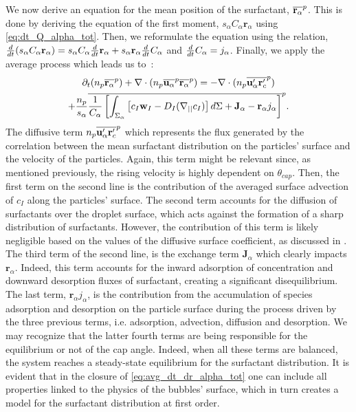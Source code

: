 We now derive an equation for the mean position of the surfactant, $\overline{\textbf{r}_\alpha}^{p}$.
This is done by deriving the equation of the first moment, $s_\alpha C_\alpha \textbf{r}_\alpha$ using \ref{eq:dt_Q_alpha_tot}. 
Then, we reformulate the equation using  the relation, $\frac{d}{d t} (s_\alpha C_\alpha \textbf{r}_\alpha) = s_\alpha C_\alpha\frac{d}{d t} \textbf{r}_\alpha+ s_\alpha \textbf{r}_\alpha\frac{d}{d t} C_\alpha $ and  $\frac{d}{d t} C_\alpha = j_\alpha$. 
Finally,  we apply the average process which leads us to~:
\begin{multline}
    \partial_t (n_p\overline{\textbf{r}_\alpha}^{p})
    + \mathbf{\nabla} \cdot (n_p\overline{\textbf{u}_\alpha}^{p}\overline{\textbf{r}_\alpha}^{p})
    =
    - \mathbf{\nabla} \cdot (n_p\overline{\textbf{u}'_\alpha\textbf{r}'_c}^{p})\\
    + \frac{n_p}{s_\alpha}\overline{
        \frac{1}{C_\alpha}\left[
            \int_{\Sigma_\alpha} 
            \left[
                c_I \textbf{w}_I
                - D_I (\mathbf{\nabla}_{||} c_I)
            \right] d\Sigma
            +\textbf{J}_\alpha
            - \textbf{r}_\alpha j_\alpha
        \right]
    }^{p}.
    \label{eq:avg_dt_dr_alpha_tot}
\end{multline}
The diffusive term $n_p\overline{\textbf{u}'_\alpha\textbf{r}'_c}^{p}$ which represents the flux generated by the correlation between the mean surfactant distribution on the particles' surface and the velocity of the particles. 
Again, this term might be relevant since, as mentioned previously, the rising velocity is highly dependent on $\theta_{cap}$.
Then, the first term on the second line is the contribution of the averaged surface advection of $c_I$ along the particles' surface. 
The second term accounts for the diffusion of surfactants over the droplet surface, which acts against the formation of a sharp distribution of surfactants.
However, the contribution of this term is likely negligible based on the values of the diffusive surface coefficient, as discussed in \citet{valkovska2000determination}.
The third term of the second line, is the exchange term $\textbf{J}_\alpha$ which clearly impacts $\textbf{r}_\alpha$.
Indeed, this term accounts for the inward adsorption of concentration and downward desorption fluxes of surfactant, creating a significant disequilibrium. 
The last term, $\textbf{r}_\alpha j_\alpha$, is the contribution from the accumulation of species adsorption and desorption on the particle surface during the process driven by the three previous terms, i.e. adsorption, advection, diffusion and desorption. 
We may recognize that the latter fourth terms are being responsible for the equilibrium or not of the cap angle. 
Indeed, when all these terms are balanced, the system reaches a steady-state equilibrium for the surfactant distribution.
It is evident that in the closure of \ref{eq:avg_dt_dr_alpha_tot} one can include all properties linked to the physics of the bubbles' surface, which in turn creates a model for the surfactant distribution at first order. 


